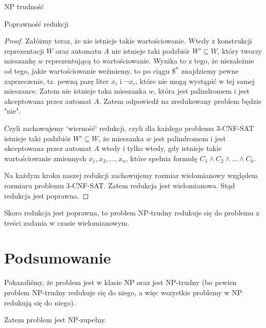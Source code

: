 \documentclass{article}
\theoremstyle{definition}
\theoremstyle{remark}
\begin{document}
\begin{section}{NP trudność}
\begin{subsection}{Poprawność redukcji}
\begin{proof}
         Załóżmy teraz, że nie istnieje takie wartościowanie. Wtedy z konstrukcji
         reprezentacji $W$ oraz automatu $A$ nie istnieje taki podzbiór $W' \subseteq
             W$, który tworzy mieszankę $w$ reprezentującą to wartościowanie. Wynika to z
         tego, że niezależnie od tego, jakie wartościowanie weźmiemy, to po ciągu $ \$^n
         $ znajdziemy pewne zaprzeczenie, tz. pewną parę liter $ x_i $ i $ \neg x_i $,
         które nie mogą wystąpić w tej samej mieszance. Zatem nie istnieje taka
         mieszanka $w$, która jest palindromem i jest akceptowana przez automat $A$.
         Zatem odpowiedź na zredukowany problem będzie "nie".

         Czyli zachowujemy `wierność` redukcji, czyli dla każdego problemu 3-CNF-SAT
         istnieje taki podzbiór $W' \subseteq W$, że mieszanka $w$ jest palindromem i
         jest akceptowana przez automat $A$ wtedy i tylko wtedy, gdy istnieje takie
         wartościowanie zmiennych $x_1, x_2, \ldots, x_n$, które spełnia formułę $C_1
             \land C_2 \land \ldots \land C_k$.

         Na każdym kroku naszej redukcji zachowujemy rozmiar wielomianowy względem
         rozmiaru problemu 3-CNF-SAT. Zatem redukcja jest wielomianowa. Stąd redukcja
         jest poprawna.

     \end{proof}

 \end{subsection}

 Skoro redukcja jest poprawna, to problem NP-trudny redukuje się do problemu z
 treści zadania w czasie wielomianowym.

\end{section}

\section {Podsumowanie}

Pokazaliśmy, że problem jest w klasie NP oraz jest NP-trudny (bo pewien problem
NP-trudny redukuje się do niego, a więc wszystkie problemy w NP redukują się do
niego).

Zatem problem jest NP-zupełny.
\end{document}
